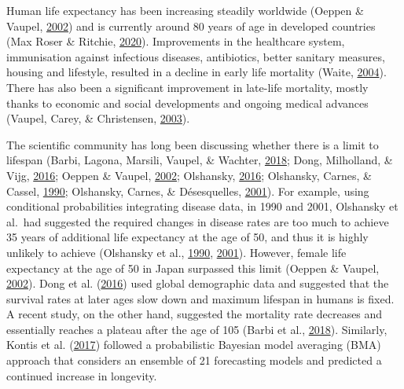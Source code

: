 \documentclass[12pt,twoside]{unicam}
\begin{document}


Human life expectancy has been increasing steadily worldwide (Oeppen \& Vaupel, \protect\hyperlink{ref-Oeppen2002}{2002}) and is currently around 80 years of age in developed countries (Max Roser \& Ritchie, \protect\hyperlink{ref-Roser2020}{2020}). Improvements in the healthcare system, immunisation against infectious diseases, antibiotics, better sanitary measures, housing and lifestyle, resulted in a decline in early life mortality (Waite, \protect\hyperlink{ref-Waite2004}{2004}). There has also been a significant improvement in late-life mortality, mostly thanks to economic and social developments and ongoing medical advances (Vaupel, Carey, \& Christensen, \protect\hyperlink{ref-Vaupel2003}{2003}).

The scientific community has long been discussing whether there is a limit to lifespan (Barbi, Lagona, Marsili, Vaupel, \& Wachter, \protect\hyperlink{ref-Barbi2018}{2018}; Dong, Milholland, \& Vijg, \protect\hyperlink{ref-Dong2016}{2016}; Oeppen \& Vaupel, \protect\hyperlink{ref-Oeppen2002}{2002}; Olshansky, \protect\hyperlink{ref-Olshansky2016}{2016}; Olshansky, Carnes, \& Cassel, \protect\hyperlink{ref-Olshansky1990}{1990}; Olshansky, Carnes, \& Désesquelles, \protect\hyperlink{ref-Olshansky2001}{2001}). For example, using conditional probabilities integrating disease data, in 1990 and 2001, Olshansky et al.~had suggested the required changes in disease rates are too much to achieve 35 years of additional life expectancy at the age of 50, and thus it is highly unlikely to achieve (Olshansky et al., \protect\hyperlink{ref-Olshansky1990}{1990}, \protect\hyperlink{ref-Olshansky2001}{2001}). However, female life expectancy at the age of 50 in Japan surpassed this limit (Oeppen \& Vaupel, \protect\hyperlink{ref-Oeppen2002}{2002}). Dong et al. (\protect\hyperlink{ref-Dong2016}{2016}) used global demographic data and suggested that the survival rates at later ages slow down and maximum lifespan in humans is fixed. A recent study, on the other hand, suggested the mortality rate decreases and essentially reaches a plateau after the age of 105 (Barbi et al., \protect\hyperlink{ref-Barbi2018}{2018}). Similarly, Kontis et al. (\protect\hyperlink{ref-Kontis2017}{2017}) followed a probabilistic Bayesian model averaging (BMA) approach that considers an ensemble of 21 forecasting models and predicted a continued increase in longevity.
\end{document}
